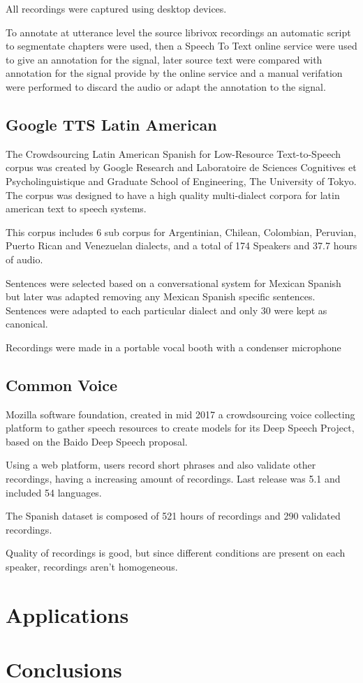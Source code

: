 \documentclass[10pt, a4paper]{article}
\begin{document}
All recordings were captured using desktop devices.

To annotate at utterance level the source librivox recordings an automatic script to segmentate chapters were used, then a Speech To Text online service were used to give an annotation for the signal, later source text were compared with annotation for the signal provide by the online service and a manual verifation were performed to discard the audio or adapt the annotation to the signal.

\subsection{Google TTS Latin American}

The Crowdsourcing Latin American Spanish for Low-Resource Text-to-Speech corpus was created by Google Research and Laboratoire de Sciences Cognitives et Psycholinguistique and Graduate School of Engineering, The University of Tokyo. The corpus was designed to have a high quality multi-dialect corpora for latin american text to speech systems.

This corpus includes 6 sub corpus for Argentinian, Chilean, Colombian, Peruvian, Puerto Rican and Venezuelan dialects, and a total of 174 Speakers and 37.7 hours of audio.

Sentences were selected based on a conversational system for Mexican Spanish but later was adapted removing any Mexican Spanish specific sentences. Sentences were adapted to each particular dialect and only 30 were kept as canonical.

Recordings were made in a portable vocal booth with a condenser microphone \cite{googleTTSLatinAmericanSpanishCorpus}



\subsection{Common Voice}

Mozilla software foundation, created in mid 2017 a crowdsourcing voice collecting platform to gather speech resources to create models for its Deep Speech Project, based on the Baido Deep Speech \cite{deepspeeh} proposal.

Using a web platform, users record short phrases and also validate other recordings, having a increasing amount of recordings. Last release was 5.1 and included  54 languages.

The Spanish dataset is composed of 521 hours of recordings and 290 validated recordings.

Quality of recordings is good, but since different conditions are present on each speaker, recordings aren't homogeneous.



\section{Applications}

\section{Conclusions}



\end{document}
